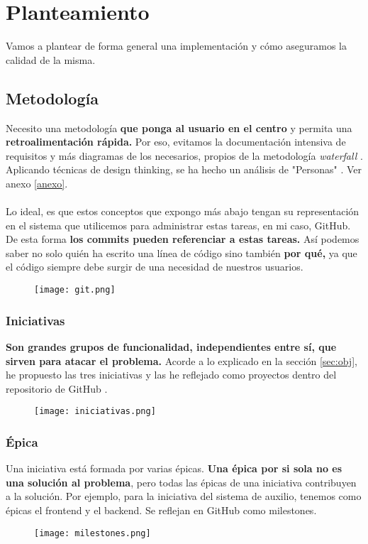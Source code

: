 \chapter{Planteamiento}

Vamos a plantear de forma general una implementación y cómo aseguramos la calidad de la misma.

\section{Metodología}

Necesito una metodología \textbf{que ponga al usuario en el centro} y permita una \textbf{retroalimentación rápida.} Por eso, evitamos la documentación intensiva de requisitos y más diagramas de los necesarios, propios de la metodología \textit{waterfall} \cite{waterfall}.\\
Aplicando técnicas de design thinking, se ha hecho un análisis de "Personas" \cite{personas}. Ver anexo \ref{anexo}.
\\\\
Lo ideal, es que estos conceptos que expongo más abajo tengan su representación en el sistema que utilicemos
para administrar estas tareas, en mi caso, GitHub. 
De esta forma \textbf{los commits pueden referenciar a estas tareas.} Así podemos
saber no solo quién ha escrito una línea de código sino también \textbf{por qué,} ya que el código siempre debe surgir de una necesidad de nuestros usuarios. 
\begin{figure}[H]
\centering	
\texttt{[image: git.png]}
\end{figure}
\subsection{Iniciativas}
\textbf{Son grandes grupos de funcionalidad, independientes entre sí, que sirven para atacar el problema.}
Acorde a lo explicado en la sección \ref{sec:obj}, he propuesto las tres iniciativas y las he 
reflejado como proyectos dentro del repositorio de GitHub \cite{repo}.
\begin{figure}[H]
\centering	
\texttt{[image: iniciativas.png]}
\end{figure}

\subsection{Épica}
Una iniciativa está formada por varias épicas. \textbf{Una épica por si sola no es una solución al problema}, pero todas las épicas de una iniciativa contribuyen a la solución.
Por ejemplo, para la iniciativa del sistema de auxilio, tenemos 
como épicas el frontend y el backend. Se reflejan en GitHub como milestones.
\begin{figure}[H]
	\centering
\texttt{[image: milestones.png]}
\end{figure}


